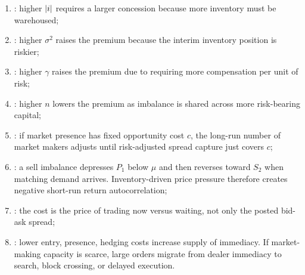 \documentclass[a4paper,oneside,openany]{book}
\begin{document}
\begin{model}
\par\smallskip\noindent{}
\begin{enumerate}[label=\roman*.]
\setlength{\itemsep}{0pt}
\item {}: higher $\left\lvert i\right\rvert$ requires a larger concession because more inventory must be warehoused;
\item {}: higher $\sigma^2$ raises the premium because the interim inventory position is riskier;
\item {}: higher $\gamma$ raises the premium due to requiring more compensation per unit of risk;
\item {}: higher $n$ lowers the premium as imbalance is shared across more risk-bearing capital;
\item {}: if market presence has fixed opportunity cost $c$, the long-run number of market makers adjusts until risk-adjusted spread capture just covers $c$;
\item {}: a sell imbalance depresses $P_1$ below $\mu$ and then reverses toward $S_2$ when matching demand arrives. Inventory-driven price pressure therefore creates negative short-run return autocorrelation;
\item {}: the cost is the price of trading now versus waiting, not only the posted bid-ask spread;
\item {}: lower entry, presence, hedging costs increase supply of immediacy. If market-making capacity is scarce, large orders migrate from dealer immediacy to search, block crossing, or delayed execution.
\end{enumerate}


\end{model}
\end{document}
